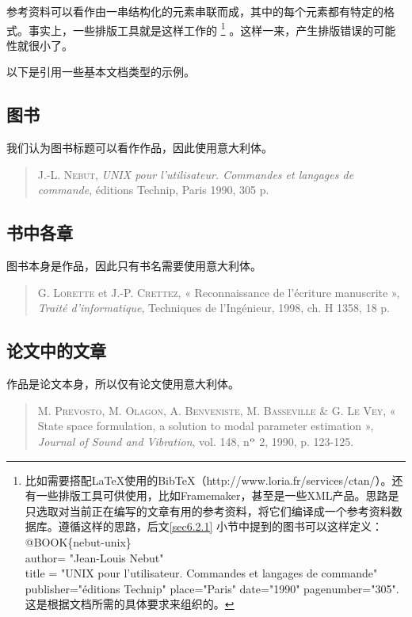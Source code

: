 参考资料可以看作由一串结构化的元素串联而成，其中的每个元素都有特定的格式。事实上，一些排版工具就是这样工作的
    \footnote{比如需要搭配\LaTeX 使用的Bib\TeX（http://www.loria.fr/services/ctan/）。还有一些排版工具可供使用，比如Framemaker，甚至是一些XML产品。思路是只选取对当前正在编写的文章有用的参考资料，将它们编译成一个参考资料数据库。遵循这样的思路，后文\ref{sec6.2.1}%
    小节中提到的图书可以这样定义：\\
    {\ttfamily 
    @BOOK\{nebut-unix\}\\
    author= "Jean-Louis Nebut"\\
    title = "UNIX pour l'utilisateur. Commandes et langages de commande"\\
    publisher="éditions Technip" place="Paris" date="1990" pagenumber="305".\\
    }
    这是根据文档所需的具体要求来组织的。}
。这样一来，产生排版错误的可能性就很小了。

以下是引用一些基本文档类型的示例。

\subsection{图书}

我们认为图书标题可以看作作品，因此使用意大利体。

\begin{quote}
    J.-L. \textsc{Nebut}, \emph{UNIX pour l’utilisateur. Commandes et langages de commande}, éditions Technip, Paris 1990, 305 p.
\end{quote}

\subsection{书中各章}

图书本身是作品，因此只有书名需要使用意大利体。

\begin{quote}
    G. \textsc{Lorette} et J.-P. \textsc{Crettez}, « Reconnaissance de l’écriture manuscrite », \emph{Traité d’informatique}, Techniques de l’Ingénieur, 1998, ch. H 1358, 18 p.
\end{quote}

\subsection{论文中的文章}

作品是论文本身，所以仅有论文使用意大利体。

\begin{quote}
    M. \textsc{Prevosto}, M. \textsc{Olagon}, A. \textsc{Benveniste}, M. \textsc{Basseville} \& G. \textsc{Le Vey}, « State space formulation, a solution to modal parameter estimation », \emph{Journal of Sound and Vibration}, vol. 148, n$^{\rm o}$ 2, 1990, p. 123-125.
\end{quote}

